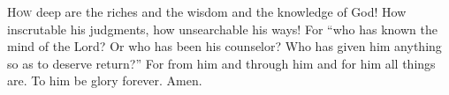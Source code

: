 
\lettrine{H}{ow} deep are the riches and the wisdom and the knowledge of God! How inscrutable his judgments, how unsearchable his ways! For “who has known the mind of the Lord? Or who has been his counselor? Who has given him anything so as to deserve return?” For from him and through him and for him all things are. To him be glory forever. Amen.